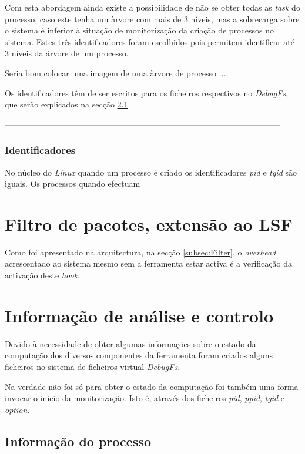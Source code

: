 Com esta abordagem ainda existe a possibilidade de não se obter todas as \textit{task} do processo, caso este tenha um àrvore com mais de 3 níveis, mas a sobrecarga sobre o sistema é inferior à situação de monitorização da criação de processos no sistema.
 Estes três identificadores foram escolhidos pois permitem identificar até 3 níveis da árvore de um processo.

Seria bom colocar uma imagem de uma àrvore de processo .... 

Os identificadores têm de ser escritos para os ficheiros respectivos no \textit{DebugFs}, que serão explicados na secção \ref{}.

-----------------------------------------------------------------------------------------------------



\subsubsection{Identificadores}

No núcleo do \textit{Linux} quando um processo é criado os identificadores \textit{pid} e \textit{tgid} são iguais.
Os processos quando efectuam



\section{Filtro de pacotes, extensão ao LSF}

Como foi apresentado na arquitectura, na secção \ref{subsec:Filter}, o \textit{overhead} acrescentado ao sistema mesmo sem a ferramenta estar activa é
a verificação da activação deste \textit{hook}.

\section{Informação de análise e controlo}

Devido à necessidade de obter algumas informações sobre o estado da computação dos diversos componentes da ferramenta foram criados alguns ficheiros no
sistema de ficheiros virtual \textit{DebugFs}.

Na verdade não foi só para obter o estado da computação foi também uma forma invocar o inicio da monitorização.
 Isto é, através dos ficheiros \textit{pid}, \textit{ppid}, \textit{tgid} e \textit{option}. 

\subsection{Informação do processo}

